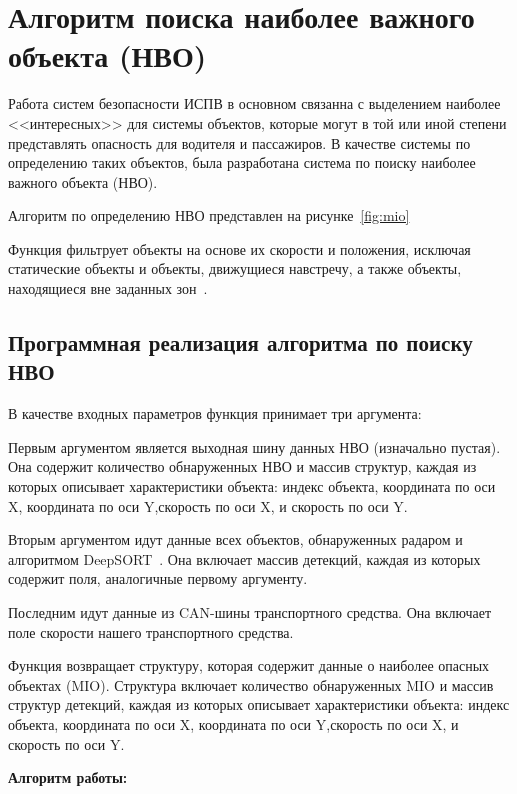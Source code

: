 \section{Алгоритм поиска наиболее важного объекта (НВО)}

Работа систем безопасности ИСПВ в основном связанна с выделением наиболее <<интересных>> для системы объектов, которые могут в той или иной степени представлять опасность для водителя и пассажиров. В качестве системы по определению таких объектов, была разработана система по поиску наиболее важного объекта (НВО).

Алгоритм по определению НВО представлен на рисунке~\ref{fig:mio}

Функция фильтрует объекты на основе их скорости и положения, исключая статические объекты и объекты, движущиеся навстречу, а также объекты, находящиеся вне заданных зон~\cite{Ziegler2014}.


\subsection{Программная реализация алгоритма по поиску НВО}

В качестве входных параметров функция принимает три аргумента:

Первым аргументом является выходная шину данных НВО (изначально пустая). Она содержит количество обнаруженных НВО и массив структур, каждая из которых описывает характеристики объекта: индекс объекта, координата по оси X, координата по оси Y,скорость по оси X, и скорость по оси Y.

Вторым аргументом идут данные всех объектов, обнаруженных радаром и алгоритмом DeepSORT~\cite{Feng_2021}. Она включает массив детекций, каждая из которых содержит поля, аналогичные первому аргументу.

Последним идут данные из CAN-шины транспортного средства. Она включает поле скорости нашего транспортного средства.

Функция возвращает структуру, которая содержит данные о наиболее опасных объектах (MIO). Структура включает количество обнаруженных MIO и массив структур детекций, каждая из которых описывает характеристики объекта: индекс объекта, координата по оси X, координата по оси Y,скорость по оси X, и скорость по оси Y.

\textbf{Алгоритм работы:}

